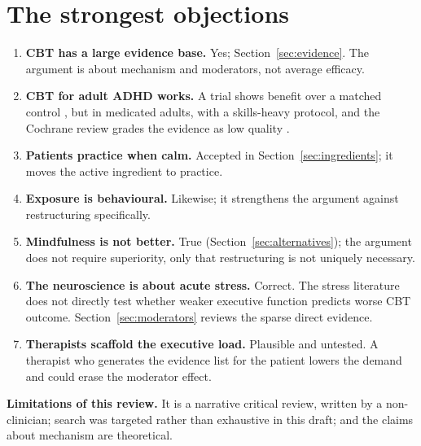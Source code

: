 \section{The strongest objections}\label{sec:objections}
\begin{enumerate}
\item \textbf{CBT has a large evidence base.} Yes; Section~\ref{sec:evidence}. The argument is about mechanism and moderators, not average efficacy.
\item \textbf{CBT for adult ADHD works.} A trial shows benefit over a matched control \citep{safren2010cbt}, but in medicated adults, with a skills-heavy protocol, and the Cochrane review grades the evidence as low quality \citep{lopez2018cochrane}.
\item \textbf{Patients practice when calm.} Accepted in Section~\ref{sec:ingredients}; it moves the active ingredient to practice.
\item \textbf{Exposure is behavioural.} Likewise; it strengthens the argument against restructuring specifically.
\item \textbf{Mindfulness is not better.} True (Section~\ref{sec:alternatives}); the argument does not require superiority, only that restructuring is not uniquely necessary.
\item \textbf{The neuroscience is about acute stress.} Correct. The stress literature does not directly test whether weaker executive function predicts worse CBT outcome. Section~\ref{sec:moderators} reviews the sparse direct evidence.
\item \textbf{Therapists scaffold the executive load.} Plausible and untested. A therapist who generates the evidence list for the patient lowers the demand and could erase the moderator effect.
\end{enumerate}
\textbf{Limitations of this review.} It is a narrative critical review, written by a non-clinician; search was targeted rather than exhaustive in this draft; and the claims about mechanism are theoretical.
